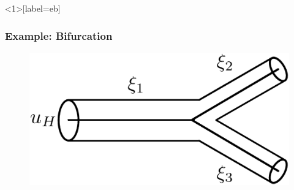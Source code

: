 \documentclass[compress]{beamer}
\begin{document}
	\begin{frame}[label=eb]
		\frametitle{Example: Bifurcation}
		\begin{figure}
			\begin{center}
				\begin{minipage}[t][0.35\paperheight][t]{\textwidth}
					\begin{minipage}{0.44\textwidth}
						\includegraphics[width=\textwidth]{images/bifurcation.eps}
					\end{minipage}
\end{minipage}
\end{center}
\end{figure}
\end{frame}
\end{document}
